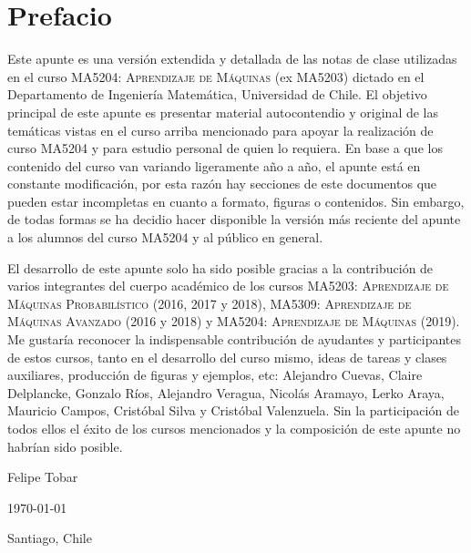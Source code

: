 \newpage
\section*{Prefacio}
Este apunte es una versión extendida y detallada de las notas de clase utilizadas en el curso \textsc{MA5204: Aprendizaje de Máquinas} (ex MA5203) dictado en el Departamento de Ingeniería Matemática, Universidad de Chile. El objetivo principal de este apunte es presentar material autocontendio y original de las temáticas vistas en el curso arriba mencionado para apoyar la realización de curso MA5204 y para estudio personal de quien lo requiera. En base a que los contenido del curso van variando ligeramente año a año, el apunte está en constante modificación, por esta razón hay secciones de este documentos que pueden estar incompletas en cuanto a formato, figuras o contenidos. Sin embargo, de todas formas se ha decidio hacer disponible la versión más reciente del apunte a los alumnos del curso MA5204 y al público en general.

El desarrollo de este apunte solo ha sido posible gracias a la contribución de varios integrantes del cuerpo académico de los cursos \textsc{MA5203: Aprendizaje de Máquinas Probabilístico} (2016, 2017 y 2018), \textsc{MA5309: Aprendizaje de Máquinas Avanzado} (2016 y 2018) y \textsc{MA5204: Aprendizaje de Máquinas} (2019). Me gustaría reconocer la indispensable contribución de ayudantes y participantes de estos cursos, tanto en el desarrollo del curso mismo, ideas de tareas y clases auxiliares, producción de figuras y ejemplos, etc: Alejandro Cuevas, Claire Delplancke, Gonzalo Ríos, Alejandro Veragua, Nicolás Aramayo, Lerko Araya, Mauricio Campos, Cristóbal Silva y Cristóbal Valenzuela. Sin la participación de todos ellos el éxito de los cursos mencionados y la composición de este apunte no habrían sido posible.


\bigskip
\begin{flushright}
  Felipe Tobar\par
  \today\par
  Santiago, Chile
\end{flushright}
\newpage


